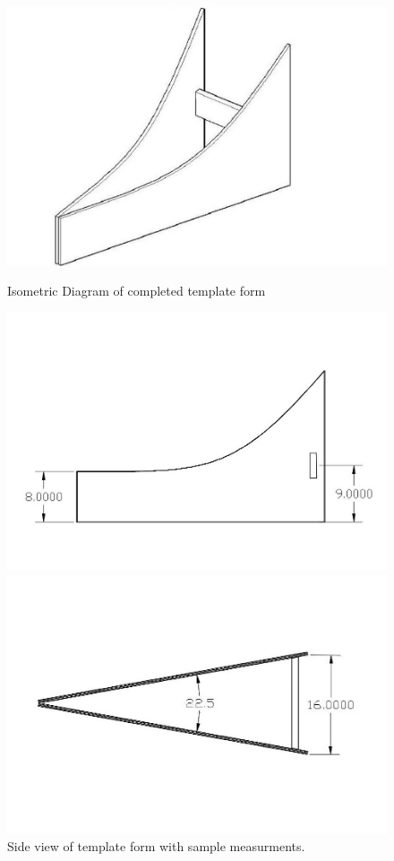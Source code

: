 \documentclass[titlepage]{article}
\begin{document}
\begin{enumerate}
\begin{figure}[!htb]
                      \includegraphics[width=\linewidth]{template_3d}
                      \caption{Isometric Diagram of completed template form}\label{fig:awesome_image1}
                    \endminipage\hfill
                      \includegraphics[width=\linewidth]{template_side}
                      \caption{Side view of template form with sample measurments.}\label{fig:awesome_image2}
                    \endminipage\hfill
                      \includegraphics[width=\linewidth]{template_top}

\end{figure}
\end{enumerate}
\end{document}
